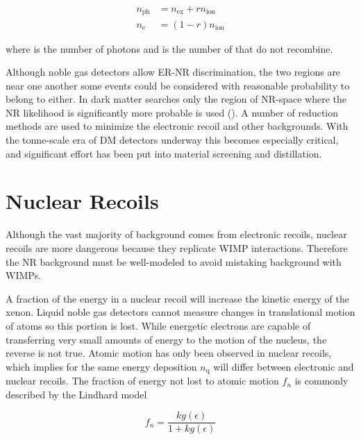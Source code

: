 \begin{subequations}
\begin{align}
n_{\mathrm{ph}} &= n_{\mathrm{ex}} + rn_{\mathrm{ion}} \\
n_{\mathrm{e}} &= (1 - r)n_{\mathrm{ion}}
\end{align}
\end{subequations}

\noindent where \nphot is the number of photons and \nelect is the number of \electron that do not recombine.

Although noble gas detectors allow ER-NR discrimination, the two regions are near one another some events could
be considered with reasonable probability to belong to either.  In dark matter searches only the region of NR-space where the NR
likelihood is significantly more probable is used ().  A number of reduction methods are used to minimize
the electronic recoil and other backgrounds.  With the tonne-scale era of DM detectors
underway this becomes especially critical, and significant effort has been put into material screening and distillation.


\section{Nuclear Recoils}
\label{sec:nr}
Although the vast majority of background comes from electronic recoils, nuclear recoils are more dangerous because they replicate
WIMP interactions.  Therefore the NR background must be well-modeled to avoid mistaking background with WIMPs.

A fraction of the energy in a nuclear recoil will increase the kinetic energy of the xenon.  Liquid noble gas detectors cannot measure
changes in translational motion of atoms so this portion is lost.  While energetic electrons are capable of transferring very small
amounts of energy to the motion of the nucleus, the reverse is not true.  Atomic motion has only been observed in nuclear recoils,
which implies for the same energy deposition $n_{\mathrm{q}}$ will differ between electronic and nuclear recoils.  The fraction of energy
not lost to atomic motion $f_{n}$ is commonly described by the Lindhard model

\begin{equation}
f_{n} = \frac{k g(\epsilon)}{1 + k g(\epsilon)}
\label{eq:linhard_quenching}
\end{equation}


